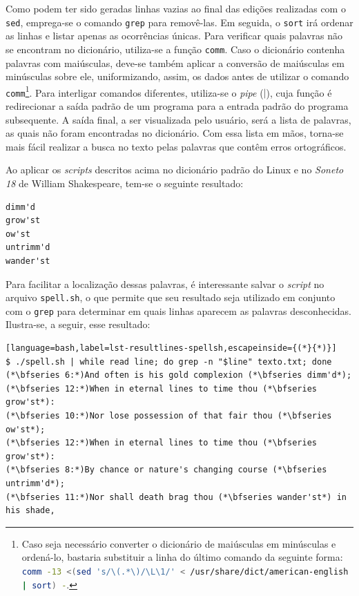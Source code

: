 \documentclass{textolivre}
\begin{document}
Como podem ter sido geradas linhas vazias ao final das edições realizadas com o \texttt{sed}, emprega-se 
o comando \texttt{grep} para removê-las.
Em seguida, o \texttt{sort} irá ordenar as linhas e listar apenas as ocorrências únicas.
Para verificar quais palavras não se encontram no dicionário, utiliza-se a função \texttt{comm}.
Caso o dicionário contenha palavras com maiúsculas, deve-se também aplicar a conversão de maiúsculas em minúsculas sobre ele,
uniformizando, assim, os dados antes de utilizar o comando \texttt{comm}\footnote{
Caso seja necessário converter o dicionário de maiúsculas em minúsculas e
ordená-lo, bastaria substituir a linha do último comando da seguinte forma: 
\lstinline[language=bash]!comm -13 <(sed 's/\(.*\)/\L\1/' < /usr/share/dict/american-english | sort) -!.
}.
Para interligar comandos diferentes, utiliza-se o \textit{pipe} ($|$), cuja função é redirecionar a saída padrão 
de um programa para a entrada padrão do programa subsequente. 
A saída final, a ser visualizada pelo usuário, será a lista de palavras, as quais não foram encontradas no dicionário.
Com essa lista em mãos, torna-se mais fácil realizar a busca no texto pelas palavras que contêm erros ortográficos.

Ao aplicar os \textit{scripts} descritos acima 
no dicionário padrão do Linux e no \textit{Soneto 18} de William Shakespeare,
tem-se o seguinte resultado:
\begin{lstlisting}[label=lst-result-spellsh]
dimm'd
grow'st
ow'st
untrimm'd
wander'st
\end{lstlisting}%

Para facilitar a localização dessas palavras,
é interessante salvar o \textit{script} no arquivo \texttt{spell.sh}, o que permite que
seu resultado seja utilizado em conjunto com o \texttt{grep}
para determinar em quais linhas aparecem as palavras desconhecidas. Ilustra-se, a seguir, esse resultado:
\begin{lstlisting}[language=bash,label=lst-resultlines-spellsh,escapeinside={(*}{*)}]
$ ./spell.sh | while read line; do grep -n "$line" texto.txt; done
(*\bfseries 6:*)And often is his gold complexion (*\bfseries dimm'd*);
(*\bfseries 12:*)When in eternal lines to time thou (*\bfseries grow'st*):
(*\bfseries 10:*)Nor lose possession of that fair thou (*\bfseries ow'st*);
(*\bfseries 12:*)When in eternal lines to time thou (*\bfseries grow'st*):
(*\bfseries 8:*)By chance or nature's changing course (*\bfseries untrimm'd*);
(*\bfseries 11:*)Nor shall death brag thou (*\bfseries wander'st*) in his shade,
\end{lstlisting}%
\end{document}
